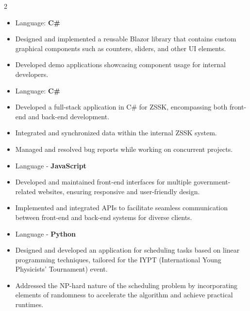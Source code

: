 \documentclass[10pt,a4paper,ragged2e,withhyper]{altacv}
\begin{document}
\begin{paracol}{2}
\divider


\begin{itemize}
\item Language: \textbf{C\#}
    \item Designed and implemented a reusable Blazor library that contains custom graphical components such as counters, sliders, and other UI elements.
    \item Developed demo applications showcasing component usage for internal developers.
\end{itemize}
\divider
{}
\begin{itemize}
\item Language: \textbf{C\#}
    \item Developed a full-stack application in C\# for ZSSK, encompassing both front-end and back-end development.
    \item Integrated and synchronized data within the internal ZSSK system.
    \item Managed and resolved bug reports while working on concurrent projects.
\end{itemize}

\divider
{}
\begin{itemize}
    \item Language - \textbf{JavaScript}
    \item Developed and maintained front-end interfaces for multiple government-related websites, ensuring responsive and user-friendly design.
    \item Implemented and integrated APIs to facilitate seamless communication between front-end and back-end systems for diverse clients.
\end{itemize}

\divider
{}
\begin{itemize}
    \item Language -  \textbf{Python}
    \item Designed and developed an application for scheduling tasks based on linear programming techniques, tailored for the IYPT (International Young Physicists’ Tournament) event.
    \item Addressed the NP-hard nature of the scheduling problem by incorporating elements of randomness to accelerate the algorithm and achieve practical runtimes.
\end{itemize}


\end{paracol}
\end{document}
